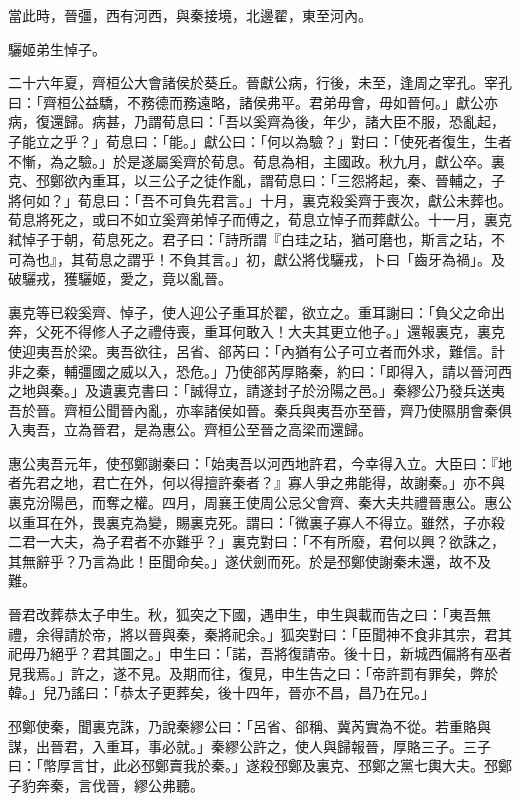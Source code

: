 \begin{pinyinscope}
當此時，晉彊，西有河西，與秦接境，北邊翟，東至河內。

驪姬弟生悼子。

二十六年夏，齊桓公大會諸侯於葵丘。晉獻公病，行後，未至，逢周之宰孔。宰孔曰：「齊桓公益驕，不務德而務遠略，諸侯弗平。君弟毋會，毋如晉何。」獻公亦病，復還歸。病甚，乃謂荀息曰：「吾以奚齊為後，年少，諸大臣不服，恐亂起，子能立之乎？」荀息曰：「能。」獻公曰：「何以為驗？」對曰：「使死者復生，生者不慚，為之驗。」於是遂屬奚齊於荀息。荀息為相，主國政。秋九月，獻公卒。裏克、邳鄭欲內重耳，以三公子之徒作亂，謂荀息曰：「三怨將起，秦、晉輔之，子將何如？」荀息曰：「吾不可負先君言。」十月，裏克殺奚齊于喪次，獻公未葬也。荀息將死之，或曰不如立奚齊弟悼子而傅之，荀息立悼子而葬獻公。十一月，裏克弒悼子于朝，荀息死之。君子曰：「詩所謂『白珪之玷，猶可磨也，斯言之玷，不可為也』，其荀息之謂乎！不負其言。」初，獻公將伐驪戎，卜曰「齒牙為禍」。及破驪戎，獲驪姬，愛之，竟以亂晉。

裏克等已殺奚齊、悼子，使人迎公子重耳於翟，欲立之。重耳謝曰：「負父之命出奔，父死不得修人子之禮侍喪，重耳何敢入！大夫其更立他子。」還報裏克，裏克使迎夷吾於梁。夷吾欲往，呂省、郤芮曰：「內猶有公子可立者而外求，難信。計非之秦，輔彊國之威以入，恐危。」乃使郤芮厚賂秦，約曰：「即得入，請以晉河西之地與秦。」及遺裏克書曰：「誠得立，請遂封子於汾陽之邑。」秦繆公乃發兵送夷吾於晉。齊桓公聞晉內亂，亦率諸侯如晉。秦兵與夷吾亦至晉，齊乃使隰朋會秦俱入夷吾，立為晉君，是為惠公。齊桓公至晉之高梁而還歸。

惠公夷吾元年，使邳鄭謝秦曰：「始夷吾以河西地許君，今幸得入立。大臣曰：『地者先君之地，君亡在外，何以得擅許秦者？』寡人爭之弗能得，故謝秦。」亦不與裏克汾陽邑，而奪之權。四月，周襄王使周公忌父會齊、秦大夫共禮晉惠公。惠公以重耳在外，畏裏克為變，賜裏克死。謂曰：「微裏子寡人不得立。雖然，子亦殺二君一大夫，為子君者不亦難乎？」裏克對曰：「不有所廢，君何以興？欲誅之，其無辭乎？乃言為此！臣聞命矣。」遂伏劍而死。於是邳鄭使謝秦未還，故不及難。

晉君改葬恭太子申生。秋，狐突之下國，遇申生，申生與載而告之曰：「夷吾無禮，余得請於帝，將以晉與秦，秦將祀余。」狐突對曰：「臣聞神不食非其宗，君其祀毋乃絕乎？君其圖之。」申生曰：「諾，吾將復請帝。後十日，新城西偏將有巫者見我焉。」許之，遂不見。及期而往，復見，申生告之曰：「帝許罰有罪矣，弊於韓。」兒乃謠曰：「恭太子更葬矣，後十四年，晉亦不昌，昌乃在兄。」

邳鄭使秦，聞裏克誅，乃說秦繆公曰：「呂省、郤稱、冀芮實為不從。若重賂與謀，出晉君，入重耳，事必就。」秦繆公許之，使人與歸報晉，厚賂三子。三子曰：「幣厚言甘，此必邳鄭賣我於秦。」遂殺邳鄭及裏克、邳鄭之黨七輿大夫。邳鄭子豹奔秦，言伐晉，繆公弗聽。


\end{pinyinscope}
